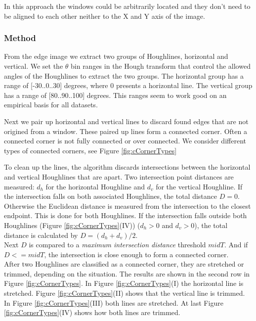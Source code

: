 In this approach the windows could be arbitrarily located and they don't need
to be aligned to each other neither to the X and Y axis of the image.

\subsubsection{Method}
From the edge image we extract two groups of Houghlines, horizontal and
vertical.  We set the $\theta$ bin ranges in the Hough transform that control the
allowed angles of the Houghlines to extract the two groups. The horizontal group
has a range of [-30..0..30] degrees, where 0 presents a horizontal line. The vertical
group has a range of [80..90..100] degrees. This ranges seem
to work good on an empirical basis for all datasets.

Next we pair up horizontal and vertical lines to discard found edges that are
not origined from a window. These paired up lines form a connected corner.
Often a connected corner is not fully connected or over connected.
We consider different types of connected corners, see Figure \ref{fig:cCornerTypes} 

To clean up the lines, the algorithm discards intersections between the
horizontal and vertical Houghlines that are apart. 
Two intersection point distances are measured: $d_h$ for the horizontal Houghline and $d_v$
for the vertical Houghline.  If the intersection falls on both associated Houghlines,
	the total distance $D=0$.  Otherwise the Euclidean distance is measured from the
	intersection to the closest endpoint. This is done for both Houghlines.  If
	the intersection falls outside both Houghlines (Figure
	\ref{fig:cCornerTypes}(IV)) ($d_h>0$ and $d_v>0$), the total
	distance is calculated by $D=(d_h + d_v)/2$.\\
	Next $D$ is compared to
	a \emph{maximum intersection distance} threshold $midT$.  And if $D<=midT$,
	the intersection is close enough to form a connected corner.\\

After two Houghlines are classified as a connected corner, they are stretched or
trimmed, depending on the situation. The results are shown in the second row in
Figure \ref{fig:cCornerTypes}.
In Figure \ref{fig:cCornerTypes}(I)  the horizontal line is stretched.  Figure
\ref{fig:cCornerTypes}(II) shows that the vertical line is trimmed.  In Figure
\ref{fig:cCornerTypes}(III) both lines are stretched.  At last Figure
\ref{fig:cCornerTypes}(IV) shows how both lines are trimmed.


